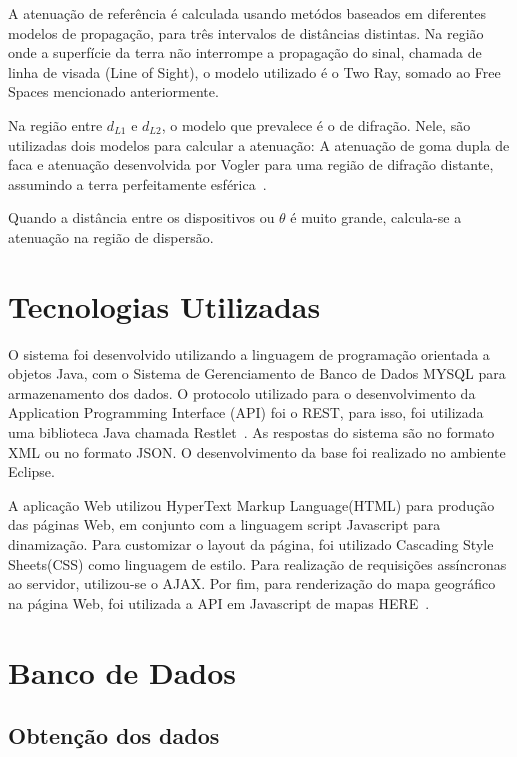 A atenuação de referência é calculada usando metódos baseados em diferentes modelos de propagação, para três intervalos de distâncias distintas. Na região onde a superfície da terra não interrompe a propagação do sinal, chamada de linha de visada (Line of Sight), o modelo utilizado é o Two Ray, somado ao Free Spaces mencionado anteriormente.

Na região entre $d_{L1}$ e $d_{L2}$, o modelo que prevalece é o de difração\cite{rufford}. Nele, são utilizadas dois modelos para calcular a atenuação: A atenuação de goma dupla de faca e atenuação desenvolvida por Vogler para uma região de difração distante, assumindo a terra perfeitamente esférica~\cite{vogler}.

Quando a distância entre os dispositivos ou $\theta$ é muito grande, calcula-se a atenuação na região de dispersão.

\section{Tecnologias Utilizadas}

O sistema foi desenvolvido utilizando a linguagem de programação orientada a objetos Java, com o Sistema de Gerenciamento de Banco de Dados MYSQL
para armazenamento dos dados. O protocolo utilizado para o desenvolvimento da  Application Programming Interface (API)
foi o REST, para isso, foi utilizada uma biblioteca Java chamada Restlet~\cite{restlet}. As respostas do sistema são no formato XML ou no formato JSON. O desenvolvimento da base foi realizado no ambiente Eclipse.

A aplicação Web utilizou  HyperText Markup Language(HTML)
para produção das páginas Web, em conjunto com a linguagem script Javascript para dinamização. Para customizar o layout da página, foi utilizado Cascading Style Sheets(CSS)
como linguagem de estilo. Para realização de requisições assíncronas ao servidor, utilizou-se o AJAX. Por fim, para renderização do mapa geográfico na página Web, foi utilizada a API em Javascript de mapas HERE~\cite{heremaps}. 

\section{Banco de Dados}

\subsection{Obtenção dos dados}

